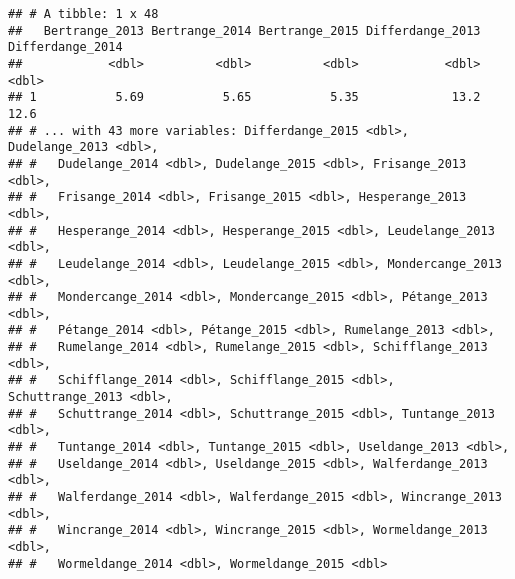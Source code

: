 \documentclass[
]{article}
\newenvironment{Shaded}{\begin{snugshade}}{\end{snugshade}}
\newcommand{\DataTypeTok}[1]{\textcolor[rgb]{0.13,0.29,0.53}{#1}}
\newcommand{\DecValTok}[1]{\textcolor[rgb]{0.00,0.00,0.81}{#1}}
\newcommand{\KeywordTok}[1]{\textcolor[rgb]{0.13,0.29,0.53}{\textbf{#1}}}
\newcommand{\NormalTok}[1]{#1}
\newcommand{\OperatorTok}[1]{\textcolor[rgb]{0.81,0.36,0.00}{\textbf{#1}}}
\newcommand{\StringTok}[1]{\textcolor[rgb]{0.31,0.60,0.02}{#1}}
\begin{document}
\begin{Shaded}
\end{Shaded}

\begin{verbatim}
## # A tibble: 1 x 48
##   Bertrange_2013 Bertrange_2014 Bertrange_2015 Differdange_2013 Differdange_2014
##            <dbl>          <dbl>          <dbl>            <dbl>            <dbl>
## 1           5.69           5.65           5.35             13.2             12.6
## # ... with 43 more variables: Differdange_2015 <dbl>, Dudelange_2013 <dbl>,
## #   Dudelange_2014 <dbl>, Dudelange_2015 <dbl>, Frisange_2013 <dbl>,
## #   Frisange_2014 <dbl>, Frisange_2015 <dbl>, Hesperange_2013 <dbl>,
## #   Hesperange_2014 <dbl>, Hesperange_2015 <dbl>, Leudelange_2013 <dbl>,
## #   Leudelange_2014 <dbl>, Leudelange_2015 <dbl>, Mondercange_2013 <dbl>,
## #   Mondercange_2014 <dbl>, Mondercange_2015 <dbl>, Pétange_2013 <dbl>,
## #   Pétange_2014 <dbl>, Pétange_2015 <dbl>, Rumelange_2013 <dbl>,
## #   Rumelange_2014 <dbl>, Rumelange_2015 <dbl>, Schifflange_2013 <dbl>,
## #   Schifflange_2014 <dbl>, Schifflange_2015 <dbl>, Schuttrange_2013 <dbl>,
## #   Schuttrange_2014 <dbl>, Schuttrange_2015 <dbl>, Tuntange_2013 <dbl>,
## #   Tuntange_2014 <dbl>, Tuntange_2015 <dbl>, Useldange_2013 <dbl>,
## #   Useldange_2014 <dbl>, Useldange_2015 <dbl>, Walferdange_2013 <dbl>,
## #   Walferdange_2014 <dbl>, Walferdange_2015 <dbl>, Wincrange_2013 <dbl>,
## #   Wincrange_2014 <dbl>, Wincrange_2015 <dbl>, Wormeldange_2013 <dbl>,
## #   Wormeldange_2014 <dbl>, Wormeldange_2015 <dbl>
\end{verbatim}
\end{document}
